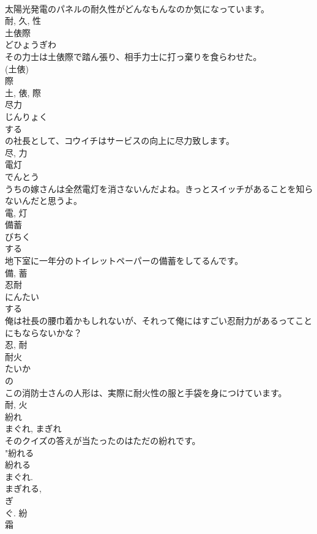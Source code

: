 \documentclass[8pt]{extreport}
\begin{document}
\begin{CJK}{UTF8}{min}
\\	太陽光発電のパネルの耐久性がどんなもんなのか気になっています。	
\\	耐, 久, 性	
\\	土俵際	
\\	どひょうぎわ	
\\	その力士は土俵際で踏ん張り、相手力士に打っ棄りを食らわせた。	
\\	(土俵) 
\\	際 
\\	土, 俵, 際	
\\	尽力	
\\	じんりょく	
\\	する 
\\	の社長として、コウイチはサービスの向上に尽力致します。	
\\	尽, 力	
\\	電灯	
\\	でんとう	
\\	うちの嫁さんは全然電灯を消さないんだよね。きっとスイッチがあることを知らないんだと思うよ。	
\\	電, 灯	
\\	備蓄	
\\	びちく	
\\	する 
\\	地下室に一年分のトイレットペーパーの備蓄をしてるんです。	
\\	備, 蓄	
\\	忍耐	
\\	にんたい	
\\	する 
\\	俺は社長の腰巾着かもしれないが、それって俺にはすごい忍耐力があるってことにもならないかな？	
\\	忍, 耐	
\\	耐火	
\\	たいか	
\\	の 
\\	この消防士さんの人形は、実際に耐火性の服と手袋を身につけています。	
\\	耐, 火	
\\	紛れ	
\\	まぐれ, まぎれ	
\\	そのクイズの答えが当たったのはただの紛れです。	
\\	"紛れる 
\\	紛れる 
\\	まぐれ. 
\\	まぎれる, 
\\	ぎ 
\\	ぐ.	紛	
\\	霜	

\end{CJK}
\end{document}
